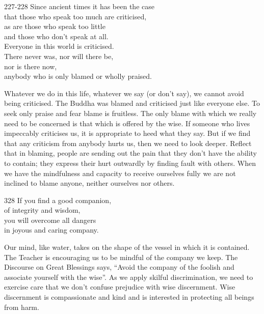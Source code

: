 
\begin{dhpVerse}{227-228}
\label{dhp-227}\label{dhp-228}
Since ancient times it has been the case\\
that those who speak too much are criticised,\\
as are those who speak too little\\
and those who don't speak at all.\\
Everyone in this world is criticised.\\
There never was, nor will there be,\\
nor is there now,\\
anybody who is only blamed or wholly praised.
\end{dhpVerse}

\begin{dhpRefl}

Whatever we do in this life, whatever we say (or don't say), we
cannot avoid being criticised. The Buddha was blamed and criticised
just like everyone else. To seek only praise and fear blame is
fruitless. The only blame with which we really need to be concerned
is that which is offered by the wise. If someone who lives impeccably
criticises us, it is appropriate to heed what they say. But if we
find that any criticism from anybody hurts us, then we need to look
deeper. Reflect that in blaming, people are sending out the pain that
they don't have the ability to contain; they express their hurt
outwardly by finding fault with others. When we have the mindfulness
and capacity to receive ourselves fully we are not inclined to blame
anyone, neither ourselves nor others.

\end{dhpRefl}


\begin{dhpVerse}{328}
\label{dhp-328}
If you find a good companion,\\
of integrity and wisdom,\\
you will overcome all dangers\\
in joyous and caring company.
\end{dhpVerse}

\begin{dhpRefl}

Our mind, like water, takes on the shape of the vessel in which it is
contained. The Teacher is encouraging us to be mindful of the company
we keep. The Discourse on Great Blessings says, ``Avoid the company
of the foolish and associate yourself with the wise''. As we apply
skilful discrimination, we need to exercise care that we don't
confuse prejudice with wise discernment. Wise discernment is
compassionate and kind and is interested in protecting all beings
from harm.

\end{dhpRefl}

